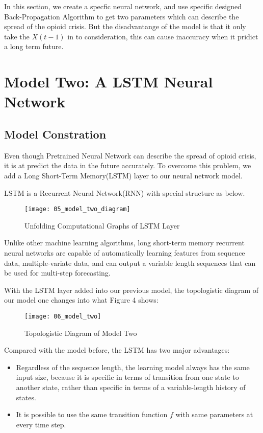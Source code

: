 \documentclass{mcmthesis}
\begin{document}
	\par In this section, we create a specfic neural network, and use specific designed Back-Propagation Algorithm to get two parameters which can describe the spread of the opioid crisis. But the disadvantange of the model is that it only take the $X(t-1)$ in to consideration, this can cause inaccuracy when it pridict a long term future.
	
	
\section{Model Two: A LSTM Neural Network}
	\subsection{Model Constration}
		\par Even though Pretrained Neural Network can describe the spread of opioid crisis, it is  at predict the data in the future accurately. To overcome this problem, we add a Long Short-Term Memory(LSTM) layer to our neural network model. 
		\par LSTM is a Recurrent Neural Network(RNN) with special structure as below.
			\begin{figure}[h]
				\texttt{[image: 05\_model\_two\_diagram]}
				\centering
				\caption{Unfolding Computational Graphs of LSTM Layer} \label{fig:05_model_two_diagram}
			\end{figure}
		\par Unlike other machine learning algorithms, long short-term memory recurrent neural networks are capable of automatically learning features from sequence data, multiple-variate data, and can output a variable length sequences that can be used for multi-step forecasting.
		\par With the LSTM layer added into our previous model, the topologistic diagram of our model one changes into what Figure 4 shows:
			\begin{figure}[h]
				\texttt{[image: 06\_model\_two]}
				\centering
				\caption{Topologistic Diagram of Model Two} \label{fig:06_model_two}
			\end{figure}
		\par Compared with the model before, the LSTM has two major advantages:
		\begin{itemize}
			\item Regardless of the sequence length, the learning model always has the same
			input size, because it is specific in terms of transition from one state to
			another state, rather than specific in terms of a variable-length history of
			states.
			\item It is possible to use the same transition function $f$ with same parameters at every time step.
		\end{itemize}
		
\end{document}
